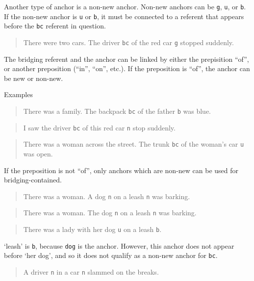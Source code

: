 \documentclass[
]{book}
\begin{document}
Another type of anchor is a non-new anchor.
Non-new anchors can be \texttt{g}, \texttt{u}, or \texttt{b}.
If the non-new anchor is \texttt{u} or \texttt{b},
it must be connected to a referent that appears before the \texttt{bc} referent in question.

\begin{quote}
There were two cars. The driver \texttt{bc} of the red car \texttt{g} stopped suddenly.
\end{quote}

The bridging referent and the anchor can be linked by either the prepisition ``of'',
or another preposition (``in'', ``on'', etc.).
If the preposition is ``of'', the anchor can be new or non-new.

Examples

\begin{quote}
There was a family. The backpack \texttt{bc} of the father \texttt{b} was blue.
\end{quote}

\begin{quote}
I saw the driver \texttt{bc} of this red car \texttt{n} stop suddenly.
\end{quote}

\begin{quote}
There was a woman across the street. The trunk \texttt{bc} of the woman's car \texttt{u} was open.
\end{quote}

If the preposition is not ``of'',
only anchors which are non-new can be used for bridging-contained.

\begin{quote}
There was a woman. A dog \texttt{n} on a leash \texttt{n} was barking.
\end{quote}

\begin{quote}
There was a woman. The dog \texttt{n} on a leash \texttt{n} was barking.
\end{quote}

\begin{quote}
There was a lady with her dog \texttt{u} on a leash \texttt{b}.
\end{quote}

`leash' is \texttt{b}, because \texttt{dog} is the anchor.
However, this anchor does not appear before `her dog',
and so it does not qualify as a non-new anchor for \texttt{bc}.

\begin{quote}
A driver \texttt{n} in a car \texttt{n} slammed on the breaks.
\end{quote}
\end{document}
